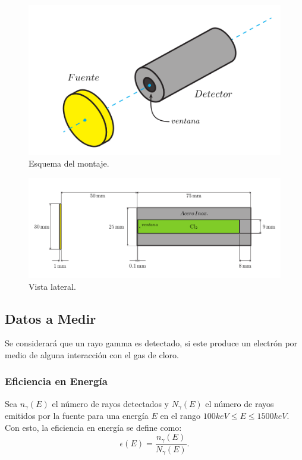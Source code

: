 \documentclass[conference]{IEEEtran}
\begin{document}
\begin{figure}[H]
	\centering
	\includegraphics[scale=0.4]{./Imagenes/detector.png}
	\caption{Esquema del montaje.}
	\label{detector}
\end{figure}


\begin{figure}[H]
	\centering
	\includegraphics[scale=0.25]{./Imagenes/lateral.png}
	\caption{Vista lateral.}
	\label{lateral}
\end{figure}
        

\subsection{Datos a Medir}
Se considerará que un rayo gamma es detectado, si este produce un electrón por medio de alguna interacción con el gas de cloro.

\subsubsection{Eficiencia en Energía}
Sea $n_\gamma (E)$ el número de rayos detectados y $N_\gamma (E)$ el número de rayos emitidos por la fuente para una energía $E$ en el rango $100keV \leq E \leq 1500 keV$. Con esto, la eficiencia en energía se define como:
\begin{equation}
	\epsilon (E) = \frac{n_\gamma (E)}{N_\gamma (E)}. \label{energia}
\end{equation}
\end{document}
